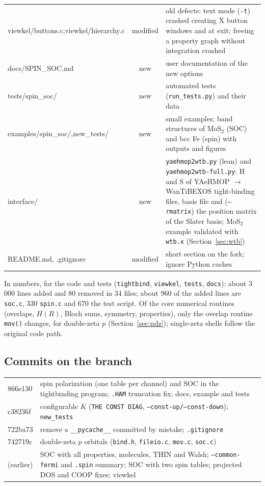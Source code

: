\documentclass[11pt,a4paper]{article}
\newcommand{\file}[1]{\texttt{#1}}
\newcommand{\fn}[1]{\texttt{#1()}}
\newcommand{\opt}[1]{\texttt{#1}}
\begin{document}
\begin{longtable}{>{\ttfamily\small\raggedright}p{4.7cm} c p{8.4cm}}
viewkel/buttons.c,\newline viewkel/hierarchy.c & modified & old defects: text mode (\texttt{-t}) crashed creating X button windows and at exit; freeing a property graph without integration crashed \\
docs/SPIN\_SOC.md      & new      & user documentation of the new options \\
tests/spin\_soc/       & new      & automated tests (\file{run\_tests.py}) and their data \\
examples/spin\_soc/,\newline new\_tests/ & new & small examples; band structures of MoS$_2$ (SOC) and bcc Fe (spin) with outputs and figures \\
interface/ & new & \file{yaehmop2wtb.py} (lean) and \file{yaehmop2wtb-full.py}: H and S of YAeHMOP $\to$ WanTiBEXOS tight-binding files, basis file and (\opt{--rmatrix}) the position matrix of the Slater basis; MoS$_2$ example validated with \texttt{wtb.x} (Section~\ref{sec:wtb}) \\
README.md, .gitignore  & modified & short section on the fork; ignore Python caches \\
\bottomrule
\end{longtable}

In numbers, for the code and tests (\file{tightbind}, \file{viewkel}, \file{tests},
\file{docs}): about 3\,000 lines added and 80 removed in 34 files; about 960 of the added
lines are \file{soc.c}, 330 \file{spin.c} and 670 the test script. Of the core numerical
routines (overlaps, $H(R)$, Bloch sums, symmetry, properties), only the overlap routine
\fn{mov} changes, for double-zeta $p$ (Section~\ref{sec:pdz}); single-zeta shells follow
the original code path.

\subsection{Commits on the branch}
\begin{center}
\begin{tabular}{>{\ttfamily}l p{11.5cm}}
\toprule
866e130 & spin polarization (one table per channel) and SOC in the tightbinding program; \texttt{.HAM} truncation fix; docs, example and tests \\
c38236f & configurable $K$ (\texttt{THE CONST DIAG}, \opt{--const-up/--const-down}); \texttt{new\_tests} \\
722ba73 & remove a \texttt{\_\_pycache\_\_} committed by mistake; \file{.gitignore} \\
742719c & double-zeta $p$ orbitals (\file{bind.h}, \file{fileio.c}, \file{mov.c}, \file{soc.c}) \\
\textrm{(earlier)} & SOC with all properties, molecules, THIN and Walsh; \opt{--common-fermi} and \texttt{.spin} summary; SOC with two spin tables; projected DOS and COOP fixes; viewkel \\
\bottomrule
\end{tabular}
\end{center}
\end{document}
